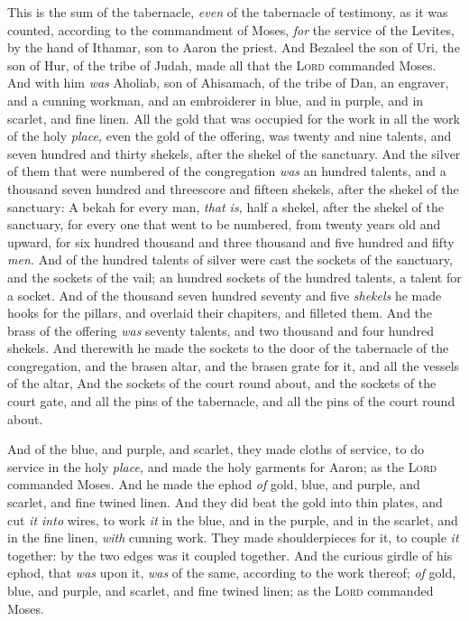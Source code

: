 \documentclass[11pt,letterpaper,oneside]{memoir}
\begin{document}
This is the sum of the tabernacle, \emph{even} of the tabernacle of
testimony, as it was counted, according to the commandment of Moses,
\emph{for} the service of the Levites, by the hand of Ithamar, son to
Aaron the priest. And Bezaleel the son of Uri, the son of Hur, of the
tribe of Judah, made all that the \textsc{Lord} commanded Moses. And
with him \emph{was} Aholiab, son of Ahisamach, of the tribe of Dan, an
engraver, and a cunning workman, and an embroiderer in blue, and in
purple, and in scarlet, and fine linen. All the gold that was occupied
for the work in all the work of the holy \emph{place,} even the gold of
the offering, was twenty and nine talents, and seven hundred and thirty
shekels, after the shekel of the sanctuary. And the silver of them that
were numbered of the congregation \emph{was} an hundred talents, and a
thousand seven hundred and threescore and fifteen shekels, after the
shekel of the sanctuary: A bekah for every man, \emph{that is,} half a
shekel, after the shekel of the sanctuary, for every one that went to be
numbered, from twenty years old and upward, for six hundred thousand and
three thousand and five hundred and fifty \emph{men. }And of the hundred
talents of silver were cast the sockets of the sanctuary, and the
sockets of the vail; an hundred sockets of the hundred talents, a talent
for a socket. And of the thousand seven hundred seventy and five
\emph{shekels} he made hooks for the pillars, and overlaid their
chapiters, and filleted them. And the brass of the offering \emph{was}
seventy talents, and two thousand and four hundred shekels. And
therewith he made the sockets to the door of the tabernacle of the
congregation, and the brasen altar, and the brasen grate for it, and all
the vessels of the altar, And the sockets of the court round about, and
the sockets of the court gate, and all the pins of the tabernacle, and
all the pins of the court round about.

And of the blue, and purple, and scarlet, they made cloths of service,
to do service in the holy \emph{place,} and made the holy garments for
Aaron; as the \textsc{Lord} commanded Moses. And he made the ephod
\emph{of} gold, blue, and purple, and scarlet, and fine twined linen.
And they did beat the gold into thin plates, and cut \emph{it into}
wires, to work \emph{it} in the blue, and in the purple, and in the
scarlet, and in the fine linen, \emph{with} cunning work. They made
shoulderpieces for it, to couple \emph{it} together: by the two edges
was it coupled together. And the curious girdle of his ephod, that
\emph{was} upon it, \emph{was} of the same, according to the work
thereof; \emph{of} gold, blue, and purple, and scarlet, and fine twined
linen; as the \textsc{Lord} commanded Moses.
\end{document}
